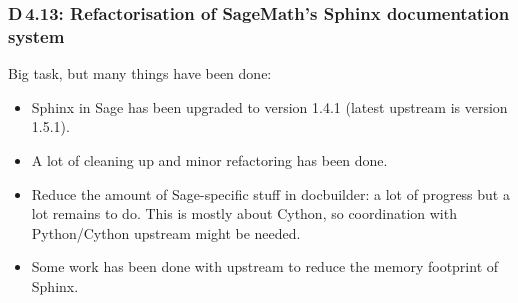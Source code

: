 \documentclass{beamer}
\begin{document}
\begin{frame}
\frametitle{D\,4.13: Refactorisation of SageMath's Sphinx documentation system}

Big task, but many things have been done:

\begin{itemize}
\item Sphinx in Sage has been upgraded to version 1.4.1 (latest upstream is version 1.5.1).

\item A lot of cleaning up and minor refactoring has been done.

\item Reduce the amount of Sage-specific stuff in docbuilder: a lot of progress
but a lot remains to do.
This is mostly about Cython, so coordination with Python/Cython upstream might be needed.

\item Some work has been done with upstream to reduce the memory footprint of Sphinx.
\end{itemize}
\end{frame}
\end{document}
